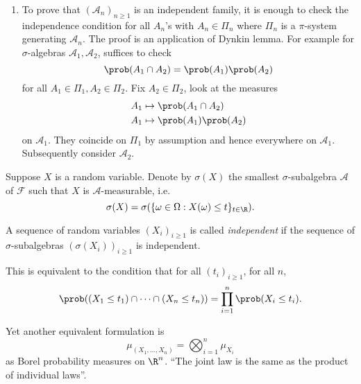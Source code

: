 \documentclass[a4paper]{article}
\renewcommand{\P}{\prob} %
\begin{document}
\begin{remark}\leavevmode
  \begin{enumerate}
  \item To prove that \((\mathcal A_n)_{n \geq 1}\) is an independent family, it is enough to check the independence condition for all \(A_n\)'s with \(A_n \in \Pi_n\) where \(\Pi_n\) is a \(\pi\)-system generating \(\mathcal A_n\). The proof is an application of Dynkin lemma. For example for \(\sigma\)-algebras \(\mathcal A_1, \mathcal A_2\), suffices to check
    \[
      \P(A_1 \cap A_2) = \P(A_1) \P(A_2)
    \]
    for all \(A_1 \in \Pi_1, A_2 \in \Pi_2\). Fix \(A_2 \in \Pi_2\), look at the measures
    \begin{align*}
      A_1 &\mapsto \P(A_1 \cap A_2) \\
      A_1 &\mapsto \P(A_1) \P(A_2)
    \end{align*}
    on \(\mathcal A_1\). They coincide on \(\Pi_1\) by assumption and hence everywhere on \(\mathcal A_1\). Subsequently consider \(\mathcal A_2\).
  \end{enumerate}
\end{remark}

\begin{notation}
  Suppose \(X\) is a random variable. Denote by \(\sigma(X)\) the smallest \(\sigma\)-subalgebra \(\mathcal A\) of \(\mathcal F\) such that \(X\) is \(\mathcal A\)-measurable, i.e.
  \[
    \sigma(X) = \sigma(\{\omega \in \Omega: X(\omega) \leq t\}_{t \in \R}).
  \]
\end{notation}

\begin{definition}[independence]
  A sequence of random variables \((X_i)_{i \geq 1}\) is called \emph{independent} if the sequence of \(\sigma\)-subalgebras \((\sigma(X_i))_{i \geq 1}\) is independent.
\end{definition}

\begin{remark}
  This is equivalent to the condition that for all \((t_i)_{i \geq 1}\), for all \(n\),
  \[
    \P((X_1 \leq t_1) \cap \dots \cap (X_n \leq t_n)) = \prod_{i = 1}^n \P(X_i \leq t_i).
  \]

  Yet another equivalent formulation is
  \[
    \mu_{(X_1, \dots, X_n)} = \bigotimes_{i = 1}^n \mu_{X_i}
  \]
  as Borel probability measures on \(\R^n\). ``The joint law is the same as the product of individual laws''.
\end{remark}
\end{document}

